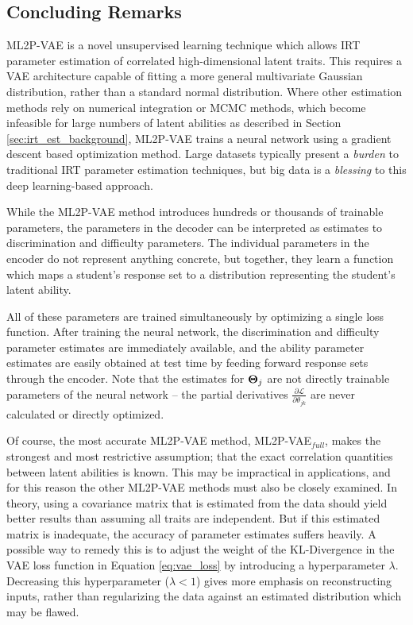 \subsection{Concluding Remarks}
ML2P-VAE is a novel unsupervised learning technique which allows IRT parameter estimation of correlated high-dimensional latent traits. This requires a VAE architecture capable of fitting a more general multivariate Gaussian distribution, rather than a standard normal distribution. Where other estimation methods rely on numerical integration or MCMC methods, which become infeasible for large numbers of latent abilities as described in Section \ref{sec:irt_est_background}, ML2P-VAE trains a neural network using a gradient descent based optimization method. Large datasets typically present a \textit{burden} to traditional IRT parameter estimation techniques, but big data is a \textit{blessing} to this deep learning-based approach.

While the ML2P-VAE method introduces hundreds or thousands of trainable parameters, the parameters in the decoder can be interpreted as estimates to discrimination and difficulty parameters. The individual parameters in the encoder do not represent anything concrete, but together, they learn a function which maps a student's response set to a distribution representing the student's latent ability.

All of these parameters are trained simultaneously by optimizing a single loss function. After training the neural network, the discrimination and difficulty parameter estimates are immediately available, and the ability parameter estimates are easily obtained at test time by feeding forward response sets through the encoder. Note that the estimates for $\boldsymbol{\Theta}_j$ are not directly trainable parameters of the neural network -- the partial derivatives $\displaystyle\frac{\partial \mathcal{L}}{\partial \theta_{jk}}$ are never calculated or directly optimized.

Of course, the most accurate ML2P-VAE method, ML2P-VAE$_{full}$, makes the strongest and most restrictive assumption; that the exact correlation quantities between latent abilities is known. This may be impractical in applications, and for this reason the other ML2P-VAE methods must also be closely examined. In theory, using a covariance matrix that is estimated from the data should yield better results than assuming all traits are independent. But if this estimated matrix is inadequate, the accuracy of parameter estimates suffers heavily. A possible way to remedy this is to adjust the weight of the KL-Divergence in the VAE loss function in Equation \ref{eq:vae_loss} by introducing a hyperparameter $\lambda$. Decreasing this hyperparameter ($\lambda < 1$) gives more emphasis on reconstructing inputs, rather than regularizing the data against an estimated distribution which may be flawed.


